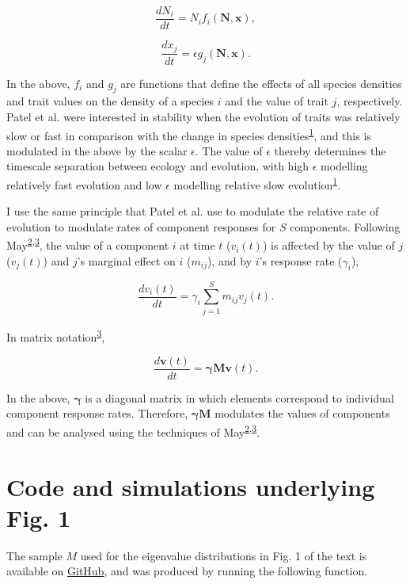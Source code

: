 \documentclass[]{article}
\begin{document}
\[\frac{dN_{i}}{dt} = N_{i}f_{i}(\mathbf{N}, \mathbf{x}),\]

\[\frac{dx_{j}}{dt} = \epsilon g_{j}(\mathbf{N}, \mathbf{x}).\]

In the above, \(f_{i}\) and \(g_{j}\) are functions that define the
effects of all species densities and trait values on the density of a
species \(i\) and the value of trait \(j\), respectively. Patel et al.
were interested in stability when the evolution of traits was relatively
slow or fast in comparison with the change in species
densities\textsuperscript{\protect\hyperlink{ref-Patel2018}{1}}, and
this is modulated in the above by the scalar \(\epsilon\). The value of
\(\epsilon\) thereby determines the timescale separation between ecology
and evolution, with high \(\epsilon\) modelling relatively fast
evolution and low \(\epsilon\) modelling relative slow
evolution\textsuperscript{\protect\hyperlink{ref-Patel2018}{1}}.

I use the same principle that Patel et al. use to modulate the relative
rate of evolution to modulate rates of component responses for \(S\)
components. Following
May\textsuperscript{\protect\hyperlink{ref-May1972}{2},\protect\hyperlink{ref-May1973}{3}},
the value of a component \(i\) at time \(t\) (\(v_{i}(t)\)) is affected
by the value of \(j\) (\(v_{j}(t)\)) and \(j\)'s marginal effect on
\(i\) (\(m_{ij}\)), and by \(i\)'s response rate (\(\gamma_{i}\)),

\[\frac{dv_{i}(t)}{dt} = \gamma_{i} \sum_{j=1}^{S}m_{ij}v_{j}(t).\]

In matrix notation\textsuperscript{\protect\hyperlink{ref-May1973}{3}},

\[\frac{d\mathbf{v}(t)}{dt} = \mathbf{\gamma} \mathbf{M}\mathbf{v}(t).\]

In the above, \(\mathbf{\gamma}\) is a diagonal matrix in which elements
correspond to individual component response rates. Therefore,
\(\mathbf{\gamma} \mathbf{M}\) modulates the values of components and
can be analysed using the techniques of
May\textsuperscript{\protect\hyperlink{ref-May1972}{2},\protect\hyperlink{ref-May1973}{3}}.

\hypertarget{Fig1}{\section{Code and simulations underlying Fig.
1}\label{Fig1}}

The sample \(M\) used for the eigenvalue distributions in Fig. 1 of the
text is available on
\href{https://github.com/bradduthie/RandomMatrixStability/tree/master/notebook/sim_results/bi_gamma}{GitHub},
and was produced by running the following function.
\end{document}
